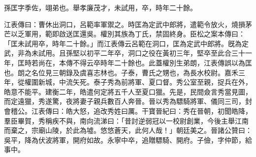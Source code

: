 
\begin{pinyinscope}
孫匡字季佐，翊弟也。舉孝廉茂才，未試用，卒，時年二十餘。

江表傳曰：曹休出洞口，呂範率軍禦之。時匡為定武中郎將，遣範令放火，燒損茅芒以乏軍用，範即啟送匡還吳。權別其族為丁氏，禁固終身。臣松之案本傳曰：「匡未試用卒，時年二十餘。」而江表傳云呂範在洞口，匡為定武中郎將。旣為定武，非為未試用。且孫堅以初平二年卒，洞口之役在黃初三年，堅卒至此合三十一年，匡時若尚在，本傳不得云卒時年二十餘也。此蓋權別生弟朗，江表傳誤以為匡也。朗之名位見三朝錄及虞喜志林也。子泰，曹氏之甥也，為長水校尉。嘉禾三年，從權圍新城，中流矢死。泰子秀為前將軍、夏口督。秀公室至親，捉兵在外，皓意不能平。建衡二年，皓遣何定將五千人至夏口獵。先是，民間僉言秀當見圖，而定遠獵，秀遂驚，夜將妻子親兵數百人奔晉。晉以秀為驃騎將軍、儀同三司，封會稽公。江表傳曰：皓大怒，追改秀姓曰厲。干寶晉紀曰：秀在晉朝，初聞皓降，羣臣畢賀，秀稱疾不與，南向流涕曰：「昔討逆弱冠以一校尉創業，今後主舉江南而棄之，宗廟山陵，於此為墟。悠悠蒼天，此何人哉！」朝廷美之。晉諸公贊曰：吳平，降為伏波將軍，開府如故。永寧中卒，追贈驃騎、開府。子儉，字仲節，給事中。


\end{pinyinscope}